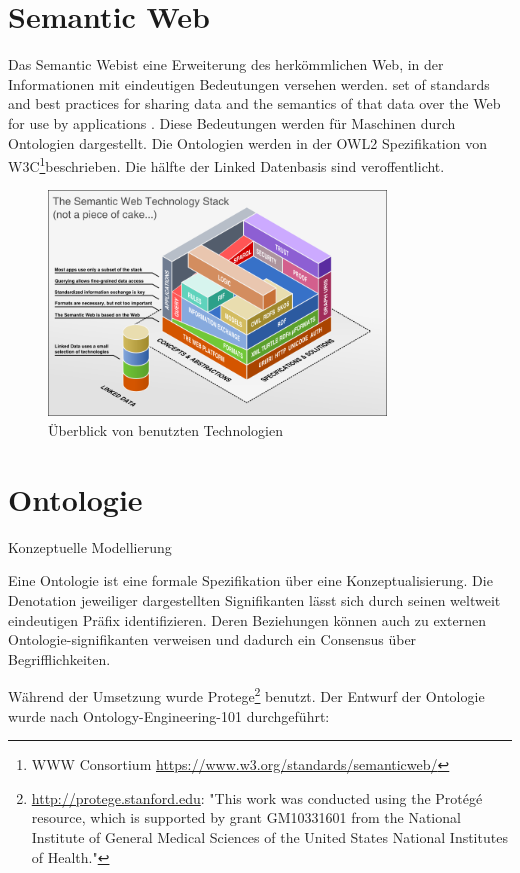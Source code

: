 \documentclass[
12pt,
english,
ngerman,
headsepline,
twoside,
openright,
numbers=noenddot,version=first
]{scrreprt}
\begin{document}
\section{Semantic Web}

Das \glqq Semantic Web\grqq ist eine Erweiterung des herkömmlichen Web, in der Informationen mit eindeutigen Bedeutungen versehen werden\cite{OntoWhat2}.
set of standards and best practices for sharing data and the semantics of that data over the Web for use by applications\cite{SparqlLearn} .
 Diese Bedeutungen werden für Maschinen durch Ontologien dargestellt. 
Die Ontologien werden in der OWL2 Spezifikation von W3C\footnote{WWW Consortium \url{https://www.w3.org/standards/semanticweb/}}beschrieben. Die hälfte der Linked Datenbasis sind veroffentlicht. 

\begin{figure}[h]
	\centering
	\includegraphics[width=0.8\textwidth]{pics/semantic_web_technology_stack.png}
	\caption{Überblick von benutzten Technologien}
	\label{fig:semantic-web-stack}
\end{figure}

\section{Ontologie}{Konzeptuelle Modellierung}
\label{subsec:ontology}

Eine Ontologie ist eine formale Spezifikation über eine Konzeptualisierung\cite{OntoWhat}. Die Denotation jeweiliger dargestellten Signifikanten lässt sich durch seinen weltweit eindeutigen Präfix identifizieren. Deren Beziehungen können auch zu externen Ontologie-signifikanten verweisen und dadurch ein Consensus über Begrifflichkeiten. 

Während der Umsetzung wurde Protege\footnote{\url{http://protege.stanford.edu}: "This work was conducted using the Protégé resource, which is supported by grant GM10331601 from the National Institute of General Medical Sciences of the United States National Institutes of Health."} benutzt.
Der Entwurf der Ontologie wurde nach Ontology-Engineering-101 durchgeführt:
\end{document}
